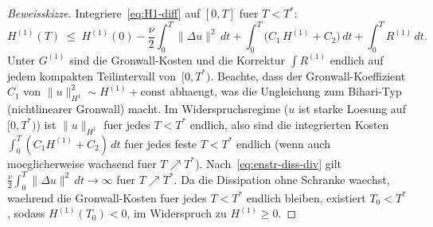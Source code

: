 \documentclass[12pt,a4paper]{article}
\theoremstyle{definition}
\theoremstyle{plain}
\theoremstyle{remark}
\begin{document}
\begin{proof}[Beweisskizze]
Integriere~\eqref{eq:H1-diff} auf $[0,T]$ fuer $T < T^*$:
\[
  H^{(1)}(T)
  \;\le\;
  H^{(1)}(0)
  - \frac{\nu}{2}\int_0^T\|\Delta u\|^2\,dt
  + \int_0^T\!\bigl(C_1\, H^{(1)} + C_2\bigr)\,dt
  + \int_0^T R^{(1)}\,dt.
\]
Unter $G^{(1)}$ sind die Gronwall-Kosten und die Korrektur $\int R^{(1)}$
endlich auf jedem kompakten Teilintervall von~$[0,T^*)$.
Beachte, dass der Gronwall-Koeffizient $C_1$ von
$\|u\|_{H^1}^2 \sim H^{(1)} + \mathrm{const}$ abhaengt, was die
Ungleichung zum Bihari-Typ (nichtlinearer Gronwall) macht. Im
Widerspruchsregime ($u$ ist starke Loesung auf $[0,T^*)$) ist
$\|u\|_{H^1}$ fuer jedes $T < T^*$ endlich, also sind die integrierten Kosten
$\int_0^T(C_1 H^{(1)} + C_2)\,dt$ fuer jedes feste $T < T^*$ endlich
(wenn auch moeglicherweise wachsend fuer $T \nearrow T^*$).
Nach~\eqref{eq:enstr-diss-div} gilt
$\frac{\nu}{2}\int_0^T\|\Delta u\|^2\,dt \to \infty$ fuer $T \nearrow T^*$.
Da die Dissipation ohne Schranke waechst, waehrend die Gronwall-Kosten fuer jedes
$T < T^*$ endlich bleiben, existiert $T_0 < T^*$, sodass
$H^{(1)}(T_0) < 0$, im Widerspruch zu $H^{(1)} \ge 0$.
\end{proof}
\end{document}
